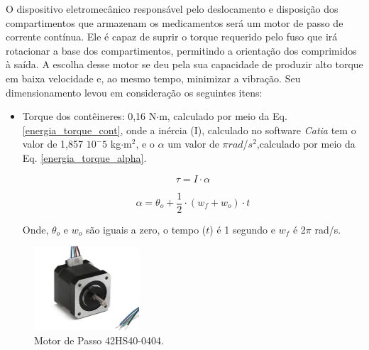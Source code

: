  O dispositivo eletromecânico responsável pelo deslocamento e disposição dos compartimentos que armazenam os medicamentos será um motor de passo de corrente contínua. Ele é capaz de suprir o torque requerido pelo fuso que irá rotacionar a base dos compartimentos, permitindo a orientação dos comprimidos à saída. A escolha desse motor se deu pela sua capacidade de produzir alto torque em baixa velocidade e, ao mesmo tempo, minimizar a vibração. Seu dimensionamento levou em consideração os seguintes itens: 

\begin{itemize}
    \item Torque dos contêineres: 0,16 N$\cdot$m, calculado por meio da Eq. \ref{energia_torque_cont}, onde a inércia (I), calculado no software \textit{Catia} tem o valor de 1,857 $10^-5$ kg$\cdot$m$^2$, e o $\alpha $ um valor de $\pi${$rad$}/{$s^2$},calculado por meio da Eq. \ref{energia_torque_alpha}.

    \begin{equation}
        \tau = I \cdot \alpha
        \label{energia_torque_cont}
    \end{equation}

        \begin{equation}
        \alpha = \theta_{o} + \frac{1}{2} \cdot (w_{f} + w_{o}) \cdot t
        \label{energia_torque_alpha}
    \end{equation}
    
    Onde, $\theta_{o}$ e $w_{o}$ são iguais a zero, o tempo ($t$) é 1 segundo e $w_f$ é 2$\pi$ rad/s.
   

    
\end{itemize}

 \begin{figure}[H]
\centering
    \includegraphics[width=0.35\textwidth]{figuras/energia/fotos_componentes/Energia_passo.png}
    \caption{Motor de Passo 42HS40-0404.}
    \label{fig:energia_passo}
\end{figure}


